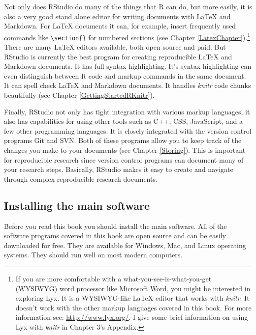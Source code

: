 \documentclass[krantz1]{krantz}
\begin{document}
Not only does RStudio do many of the things that R can do, but more easily, it is also a very good stand alone editor for writing documents with LaTeX and Markdown. For LaTeX documents it can, for example, insert frequently used commands like \texttt{\textbackslash{}section\{\}} for numbered sections (see Chapter \ref{LatexChapter}).\footnote{If you are more comfortable with a what-you-see-is-what-you-get (WYSIWYG) word processor like Microsoft Word, you might be interested in exploring Lyx. It is a WYSIWYG-like LaTeX editor that works with {\emph{knitr}}. It doesn't work with the other markup languages covered in this book. For more information see: \url{http://www.lyx.org/}. I give some brief information on using Lyx with \emph{knitr} in Chapter 3's Appendix.}  There are many LaTeX editors available, both open source and paid. But RStudio is currently the best program for creating reproducible LaTeX and Markdown documents. It has full syntax highlighting. It's syntax highlighting can even distinguish between R code and markup commands in the same document. It can spell check LaTeX and Markdown documents. It handles {\emph{knitr}} code chunks beautifully (see Chapter \ref{GettingStartedRKnitr}). 

Finally, RStudio not only has tight integration with various markup languages, it also has capabilities for using other tools such as C++, CSS, JavaScript, and a few other programming languages. It is closely integrated with the version control programs Git and SVN. Both of these programs allow you to keep track of the changes you make to your documents (see Chapter \ref{Storing}). This is important for reproducible research since version control programs can document many of your research steps. Basically, RStudio makes it easy to create and navigate through complex reproducible research documents.  

\subsection{Installing the main software}\label{InstallR}

Before you read this book you should install the main software. All of the software programs covered in this book are open source and can be easily downloaded for free. They are available for Windows, Mac, and Linux operating systems. They should run well on most modern computers. 
\end{document}
